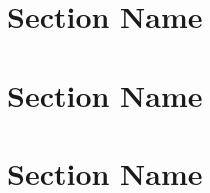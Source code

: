 \documentclass[../../note.tex]{subfiles}
\begin{document}
\section{Section Name}

\section{Section Name}

\section{Section Name}
\end{document}

